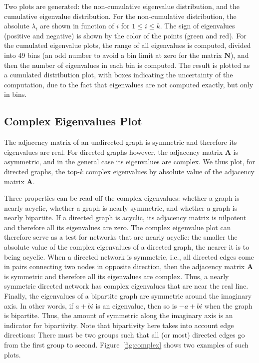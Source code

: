 \documentclass{article}
\begin{document}
Two plots are generated: the non-cumulative eigenvalue distribution, and
the cumulative eigenvalue distribution.  For the non-cumulative
distribution, the absolute $\lambda_i$ are shown in function of $i$ for
$1 \leq i \leq k$.  The sign of eigenvalues (positive and negative) is
shown by the color of the points (green and red).  For the cumulated
eigenvalue plots, the range of all eigenvalues is computed, divided into
49 bins (an odd number to avoid a bin limit at zero for the matrix
$\mathbf N$), and then the number of eigenvalues in each bin is
computed.  The result is plotted as a cumulated distribution plot, with
boxes indicating the uncertainty of the computation, due to the fact
that eigenvalues are not computed exactly, but only in bins.

\subsection{Complex Eigenvalues Plot}
The adjacency matrix of an undirected graph is symmetric and therefore
its eigenvalues are real.  For directed graphs however, the adjacency
matrix $\mathbf A$ is asymmetric, and in the general case its
eigenvalues are complex.  We thus plot, for directed graphs, the top-$k$
complex eigenvalues by absolute value of the adjacency matrix $\mathbf
A$.

Three properties can be read off the complex eigenvalues: whether a graph
is nearly acyclic, whether a graph is nearly symmetric, and whether a
graph is nearly bipartite.  If a  
directed graph is acyclic, its adjacency matrix is nilpotent and
therefore all its eigenvalues are zero. The complex eigenvalue plot can
therefore serve as a test for networks that are nearly acyclic: the
smaller the absolute value of the complex eigenvalues of a directed
graph, the nearer it is to being acyclic.  When a directed network is
symmetric, i.e., all directed edges come in pairs connecting two nodes
in opposite direction, then the adjacency matrix $\mathbf A$ is
symmetric and therefore all its eigenvalues are complex. Thus, a nearly
symmetric directed network has complex eigenvalues that are near the
real line.  
Finally, the eigenvalues of a bipartite graph are symmetric around the
imaginary axis.  In other words, if $a+bi$ is an eigenvalue, then so
is $-a+bi$ when the graph is bipartite.  Thus, the amount of symmetric
along the imaginary axis is an indicator for bipartivity. Note that
bipartivity here takes into account edge directions:  There must be two
groups such that all (or most) directed edges go from the first group to
second. 
Figure~\ref{fig:complex} shows two examples of such plots.
\end{document}
